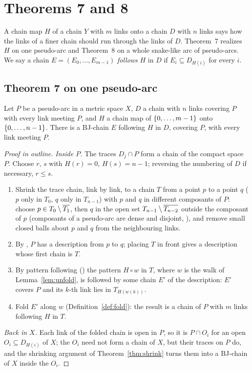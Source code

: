 \chapter{Theorems 7 and 8}\label{ch:thm78}

A chain map $H$ of a chain $Y$ with $m$ links onto a chain $D$ with $n$ links says how the links of a finer chain should run through the links of $D$.
Theorem~7 realizes $H$ on one pseudo-arc and Theorem~8 on a whole snake-like arc of pseudo-arcs. We say a chain $E=(E_0,\dots,E_{m-1})$ \emph{follows} $H$ in
$D$ if $E_i\subseteq D_{H(i)}$ for every $i$.

\section{Theorem 7 on one pseudo-arc}

\begin{theorem}\label{thm:bj7}
Let $P$ be a pseudo-arc in a metric space $X$, $D$ a chain with $n$ links covering $P$ with every link meeting $P$, and $H$ a chain map of $\left\{ 0,\dots,m-1 \right\}$
onto $\left\{ 0,\dots,n-1 \right\}$. There is a BJ-chain $E$ following $H$ in $D$, covering $P$, with every link meeting $P$.
\end{theorem}

\begin{proof}[Proof in outline]
\emph{Inside $P$.} The traces $D_j\cap P$ form a chain of the compact space $P$. Choose $r$, $s$ with $H(r)=0$, $H(s)=n-1$; reversing the numbering of $D$ if
necessary, $r\le s$.
\begin{enumerate}[label=(\alph*)]
\item Shrink the trace chain, link by link, to a chain $T$ from a point $p$ to a point $q$ ($p$ only in $T_0$, $q$ only in $T_{n-1}$) with $p$ and $q$ in different
composants of $P$: choose $p\in T_0\setminus\overline{T_1}$, then $q$ in the open set $T_{n-1}\setminus\overline{T_{n-2}}$ outside the composant of $p$ (composants of a
pseudo-arc are dense and disjoint, ), and remove small closed balls about $p$ and $q$ from the neighbouring links.
\item By , $P$ has a description from $p$ to $q$; placing $T$ in front gives a description whose first chain is $T$.
\item By pattern following () the pattern $H\circ w$ in $T$, where $w$ is the walk of Lemma~\ref{lem:unfold}, is followed by some chain $E'$ of
the description: $E'$ covers $P$ and its $k$-th link lies in $T_{H(w(k))}$.
\item Fold $E'$ along $w$ (Definition~\ref{def:fold}): the result is a chain of $P$ with $m$ links following $H$ in $T$.
\end{enumerate}
\emph{Back in $X$.} Each link of the folded chain is open in $P$, so it is $P\cap O_i$ for an open $O_i\subseteq D_{H(i)}$ of $X$; the $O_i$ need not form a chain of
$X$, but their traces on $P$ do, and the shrinking argument of Theorem~\ref{thm:shrink} turns them into a BJ-chain of $X$ inside the $O_i$.
\end{proof}

